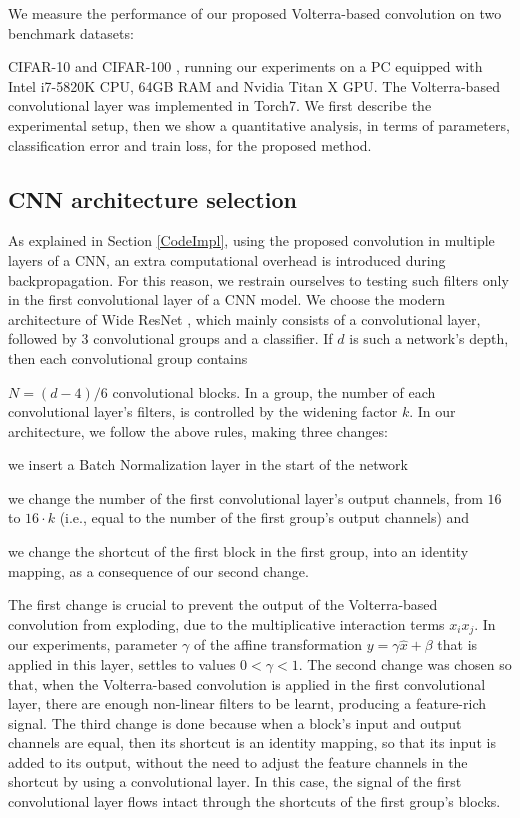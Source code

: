 \documentclass[10pt,twocolumn,letterpaper]{article}
\begin{document}

     We measure the performance of our proposed Volterra-based convolution on two benchmark datasets:
     
     CIFAR-10 and CIFAR-100 \cite{Kriz09}, running our experiments on a PC equipped with  Intel i7-5820K CPU, 64GB RAM and Nvidia Titan X GPU. The Volterra-based convolutional layer was implemented in Torch7. We first describe the experimental setup, then we show a quantitative analysis, in terms of parameters, classification error and train loss, for the proposed method.

\subsection{CNN architecture selection}

   As explained in Section \ref{CodeImpl}, using the proposed convolution in multiple layers of a CNN, an extra computational overhead is introduced during backpropagation. For this reason, we restrain ourselves to testing such filters only in the first convolutional layer of a CNN model. We choose the modern architecture of Wide ResNet \cite{WRN16}, which mainly consists of a convolutional layer, followed by 3 convolutional groups and a classifier. If $d$ is such a network's depth, then each convolutional group contains
   
   $N=(d-4)/6$
   convolutional blocks. In a group, the number of each convolutional layer's filters, is controlled by the widening factor $k$. In our architecture, we follow the above rules, making three changes:
\begin{enumerate*}[label={\alph*)}]
\item we insert a Batch Normalization layer in the start of the network
\item we change the number of the first convolutional layer's output channels, from $16$ to $16 \cdot k$ (i.e., equal to the number of the first group's output channels) and
\item we change the shortcut of the first block in the first group, into an identity mapping, as a consequence of our second change.
\end{enumerate*}
The first change is crucial to prevent the output of the Volterra-based convolution from exploding, due to the multiplicative interaction terms $x_ix_j$. In our experiments, parameter $\gamma$ of the affine transformation $y=\gamma\hat{x}+\beta$ that is applied in this layer, settles to values $0<\gamma<1$. The second change was chosen so that, when the Volterra-based convolution is applied in the first convolutional layer, there are enough non-linear filters to be learnt, producing a feature-rich signal. The third change is done because when a block's input and output channels are equal, then its shortcut is an identity mapping, so that its input is added to its output, without the need to adjust the feature channels in the shortcut by using a convolutional layer. In this case, the signal of the first convolutional layer flows intact through the shortcuts of the first group's blocks.
\end{document}
